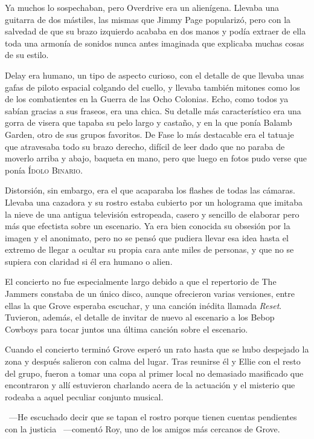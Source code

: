 Ya muchos lo sospechaban, pero Overdrive era un alienígena. Llevaba una guitarra de dos mástiles, las mismas que Jimmy Page popularizó, pero con la salvedad de que su brazo izquierdo acababa en dos manos y podía extraer de ella toda una armonía de sonidos nunca antes imaginada que explicaba muchas cosas de su estilo.

Delay era humano, un tipo de aspecto curioso, con el detalle de que llevaba unas gafas de piloto espacial colgando del cuello, y llevaba también mitones como los de los combatientes en la Guerra de las Ocho Colonias. Echo, como todos ya sabían gracias a sus fraseos, era una chica. Su detalle más característico era una gorra de visera que tapaba su pelo largo y castaño, y en la que ponía Balamb Garden, otro de sus grupos favoritos. De Fase lo más destacable era el tatuaje que atravesaba todo su brazo derecho, difícil de leer dado que no paraba de moverlo arriba y abajo, baqueta en mano, pero que luego en fotos pudo verse que ponía \textsc{Ídolo Binario}.

Distorsión, sin embargo, era el que acaparaba los flashes de todas las cámaras. Llevaba una cazadora y su rostro estaba cubierto por un holograma que imitaba la nieve de una antigua televisión estropeada, casero y sencillo de elaborar pero más que efectista sobre un escenario. Ya era bien conocida su obsesión por la imagen y el anonimato, pero no se pensó que pudiera llevar esa idea hasta el extremo de llegar a ocultar su propia cara ante miles de personas, y que no se supiera con claridad si él era humano o alien.

El concierto no fue especialmente largo debido a que el repertorio de The Jammers constaba de un único disco, aunque ofrecieron varias versiones, entre ellas la que Grove esperaba escuchar, y una canción inédita llamada \emph{Reset}. Tuvieron, además, el detalle de invitar de nuevo al escenario a los Bebop Cowboys para tocar juntos una última canción sobre el escenario.

Cuando el concierto terminó Grove esperó un rato hasta que se hubo despejado la zona y después salieron con calma del lugar. Tras reunirse él y Ellie con el resto del grupo, fueron a tomar una copa al primer local no demasiado masificado que encontraron y allí estuvieron charlando acera de la actuación y el misterio que rodeaba a aquel peculiar conjunto musical.

~---He escuchado decir que se tapan el rostro porque tienen cuentas pendientes con la justicia ~---comentó Roy, uno de los amigos más cercanos de Grove.

